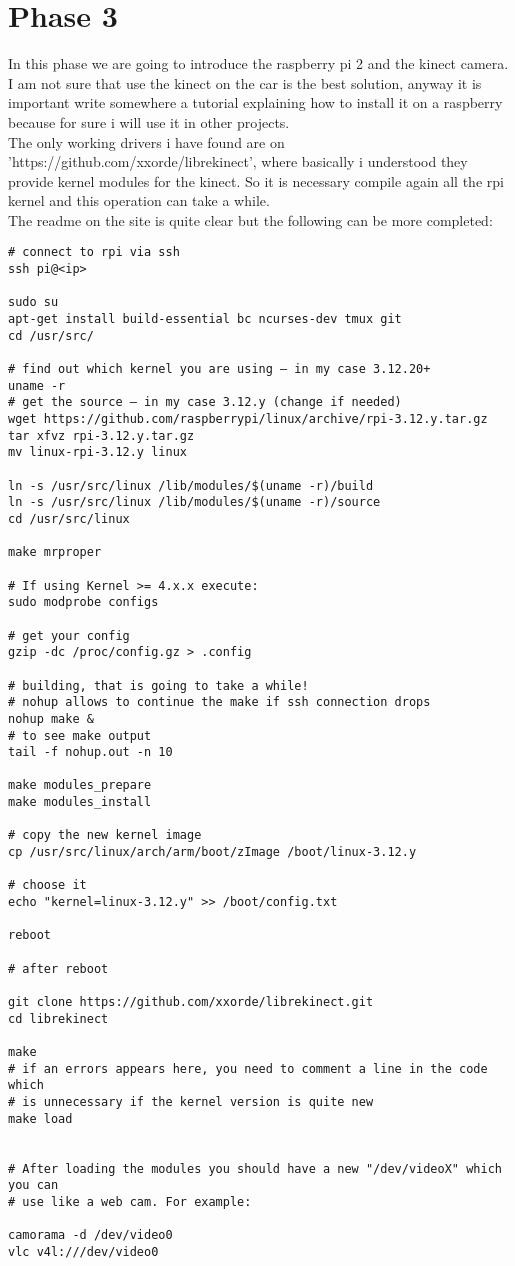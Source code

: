 \section{Phase 3}
In this phase we are going to introduce the raspberry pi 2 and the kinect camera. I am not sure that use the kinect on the car is the best solution, anyway it is important write somewhere a tutorial explaining how to install it on a raspberry because for sure i will use it in other projects. \\
The only working drivers i have found are on 'https://github.com/xxorde/librekinect', where basically i understood they provide kernel modules for the kinect. So it is necessary compile again all the rpi kernel and this operation can take a while.\\
The readme on the site is quite clear but the following can be more completed:
\begin{verbatim}
# connect to rpi via ssh
ssh pi@<ip>

sudo su
apt-get install build-essential bc ncurses-dev tmux git
cd /usr/src/

# find out which kernel you are using – in my case 3.12.20+
uname -r
# get the source – in my case 3.12.y (change if needed) 
wget https://github.com/raspberrypi/linux/archive/rpi-3.12.y.tar.gz
tar xfvz rpi-3.12.y.tar.gz
mv linux-rpi-3.12.y linux

ln -s /usr/src/linux /lib/modules/$(uname -r)/build
ln -s /usr/src/linux /lib/modules/$(uname -r)/source 
cd /usr/src/linux

make mrproper

# If using Kernel >= 4.x.x execute:
sudo modprobe configs

# get your config
gzip -dc /proc/config.gz > .config

# building, that is going to take a while!
# nohup allows to continue the make if ssh connection drops
nohup make &
# to see make output
tail -f nohup.out -n 10

make modules_prepare
make modules_install

# copy the new kernel image
cp /usr/src/linux/arch/arm/boot/zImage /boot/linux-3.12.y

# choose it
echo "kernel=linux-3.12.y" >> /boot/config.txt

reboot

# after reboot

git clone https://github.com/xxorde/librekinect.git
cd librekinect

make
# if an errors appears here, you need to comment a line in the code which 
# is unnecessary if the kernel version is quite new 
make load


# After loading the modules you should have a new "/dev/videoX" which you can 
# use like a web cam. For example:

camorama -d /dev/video0
vlc v4l:///dev/video0
\end{verbatim}
